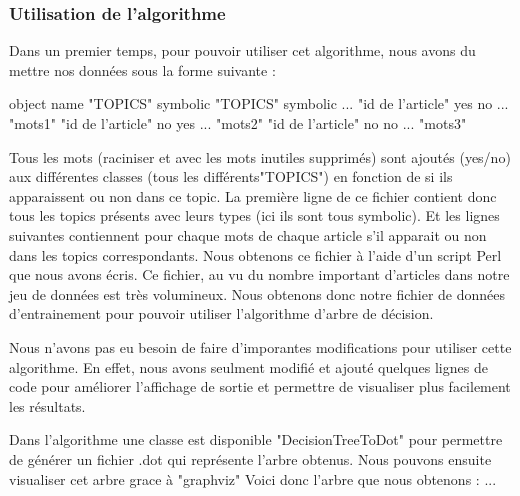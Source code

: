 \subsubsection{Utilisation de l'algorithme}

Dans un premier temps, pour pouvoir utiliser cet algorithme, nous avons du mettre nos données sous la forme suivante :

object name "TOPICS" symbolic "TOPICS" symbolic ...
"id de l'article" yes no ... "mots1"
"id de l'article" no yes ... "mots2"
"id de l'article" no no ... "mots3"

Tous les mots (raciniser et avec les mots inutiles supprimés) sont ajoutés (yes/no) aux différentes classes (tous les différents"TOPICS") en fonction de si ils apparaissent ou non dans ce topic.
La première ligne de ce fichier contient donc tous les topics présents avec leurs types (ici ils sont tous symbolic). Et les lignes suivantes contiennent pour chaque mots de chaque article s'il apparait ou non dans les topics correspondants.
Nous obtenons ce fichier à l'aide d'un script Perl que nous avons écris. Ce fichier, au vu du nombre important d'articles dans notre jeu de données est très volumineux. Nous obtenons donc notre fichier de données d'entrainement pour pouvoir utiliser l'algorithme d'arbre de décision.

Nous n'avons pas eu besoin de faire d'imporantes modifications pour utiliser cette algorithme. En effet, nous avons seulment modifié et ajouté quelques lignes de code pour améliorer l'affichage de sortie et permettre de visualiser plus facilement les résultats.

Dans l'algorithme une classe est disponible "DecisionTreeToDot" pour permettre de générer un fichier .dot qui représente l'arbre obtenus. Nous pouvons ensuite visualiser cet arbre grace à "graphviz"
Voici donc l'arbre que nous obtenons :
...

